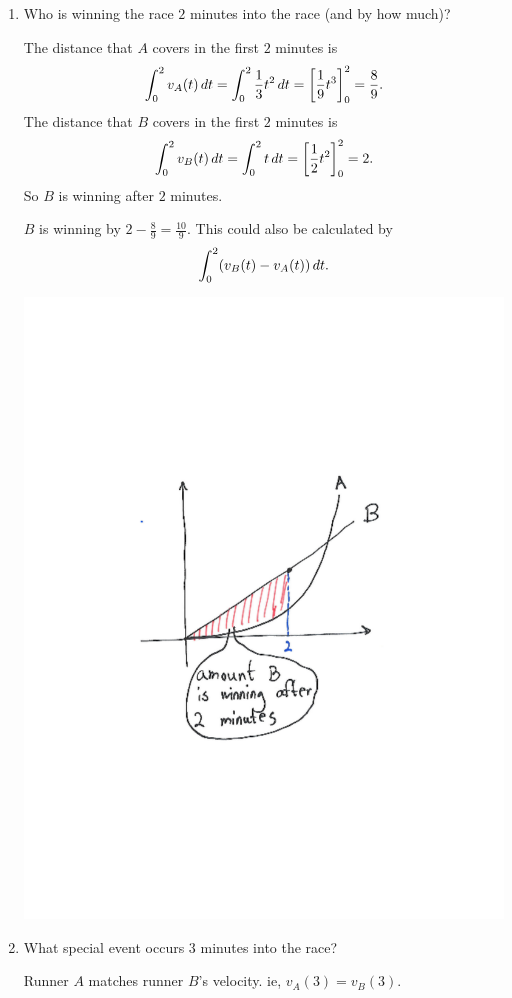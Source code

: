 \documentclass[noinstructornotes]{ximera}
\begin{document}
\begin{problem}
\begin{enumerate}
		\item  Who is winning the race $2$ minutes into the race (and by how much)?
		\begin{freeResponse}
		The distance that $A$ covers in the first $2$ minutes is
		\[
		\int_0^2 v_A(t) \,d t = \int_0^2 \frac{1}{3} t^2 \,d t = \bigg[ \frac{1}{9} t^3 \bigg]_0^2 = \frac{8}{9}.
		\]
		The distance that $B$ covers in the first $2$ minutes is
		\[
		\int_0^2 v_B(t) \,d t = \int_0^2 t \,d t = \bigg[ \frac{1}{2} t^2 \bigg]_0^2 = 2.
		\]
		So $B$ is winning after $2$ minutes.
		
		$B$ is winning by $2 - \frac{8}{9} = \frac{10}{9}$.  
		This could also be calculated by
		\[
		\int_0^2 (v_B(t) - v_A(t)) \,d t.
		\]
			\begin{image}
			\includegraphics[trim= 130 230 100 230,scale=0.8]{Figure6-2-6.pdf}
			\end{image}
		\end{freeResponse}
		
		\item  What special event occurs $3$ minutes into the race?
		\begin{freeResponse}
		Runner $A$ matches runner $B$'s velocity.  
		ie, $v_A(3) = v_B(3)$.  
		\end{freeResponse}
		

\end{enumerate}
\end{problem}
\end{document}
